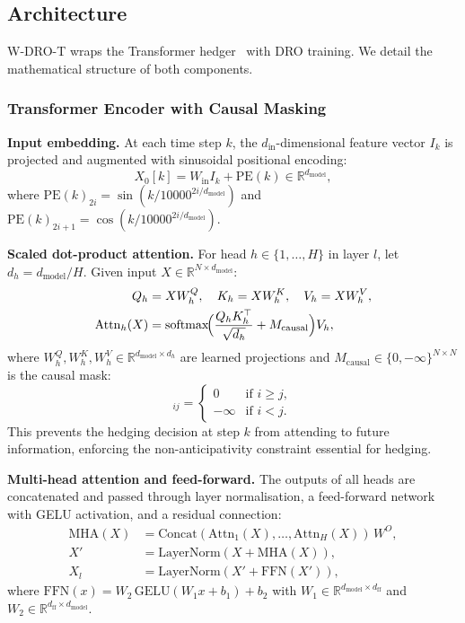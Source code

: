\documentclass[11pt]{article}
\newcommand{\R}{\mathbb{R}}
\begin{document}
\subsection{Architecture}

W-DRO-T wraps the Transformer hedger~\citep{vaswani2017attention} with DRO training.  We detail the mathematical structure of both components.

\subsubsection{Transformer Encoder with Causal Masking}

\textbf{Input embedding.}  At each time step $k$, the $d_{\mathrm{in}}$-dimensional feature vector $I_k$ is projected and augmented with sinusoidal positional encoding:
\begin{equation}
    X_0[k] = W_{\mathrm{in}} I_k + \mathrm{PE}(k) \in \R^{d_{\mathrm{model}}},
    \label{eq:input_proj}
\end{equation}
where $\mathrm{PE}(k)_{2i} = \sin(k / 10000^{2i/d_{\mathrm{model}}})$ and $\mathrm{PE}(k)_{2i+1} = \cos(k / 10000^{2i/d_{\mathrm{model}}})$.

\textbf{Scaled dot-product attention.}  For head $h \in \{1,\ldots,H\}$ in layer $l$, let $d_h = d_{\mathrm{model}}/H$.  Given input $X \in \R^{N \times d_{\mathrm{model}}}$:
\begin{align}
    Q_h &= X W_h^Q, \quad K_h = X W_h^K, \quad V_h = X W_h^V, \label{eq:qkv}\\
    \mathrm{Attn}_h(X) &= \mathrm{softmax}\!\Bigl(\frac{Q_h K_h^\top}{\sqrt{d_h}} + M_{\mathrm{causal}}\Bigr) V_h, \label{eq:sdpa}
\end{align}
where $W_h^Q, W_h^K, W_h^V \in \R^{d_{\mathrm{model}} \times d_h}$ are learned projections and $M_{\mathrm{causal}} \in \{0, -\infty\}^{N \times N}$ is the causal mask:
\begin{equation}
    [M_{\mathrm{causal}}]_{ij} = \begin{cases} 0 & \text{if } i \ge j, \\ -\infty & \text{if } i < j. \end{cases}
\end{equation}
This prevents the hedging decision at step $k$ from attending to future information, enforcing the non-anticipativity constraint essential for hedging.

\textbf{Multi-head attention and feed-forward.}  The outputs of all heads are concatenated and passed through layer normalisation, a feed-forward network with GELU activation, and a residual connection:
\begin{align}
    \mathrm{MHA}(X) &= \mathrm{Concat}(\mathrm{Attn}_1(X), \ldots, \mathrm{Attn}_H(X))\, W^O, \label{eq:mha}\\
    X' &= \mathrm{LayerNorm}(X + \mathrm{MHA}(X)), \label{eq:ln1}\\
    X_l &= \mathrm{LayerNorm}(X' + \mathrm{FFN}(X')), \label{eq:ln2}
\end{align}
where $\mathrm{FFN}(x) = W_2\,\mathrm{GELU}(W_1 x + b_1) + b_2$ with $W_1 \in \R^{d_{\mathrm{model}} \times d_{\mathrm{ff}}}$ and $W_2 \in \R^{d_{\mathrm{ff}} \times d_{\mathrm{model}}}$.
\end{document}
